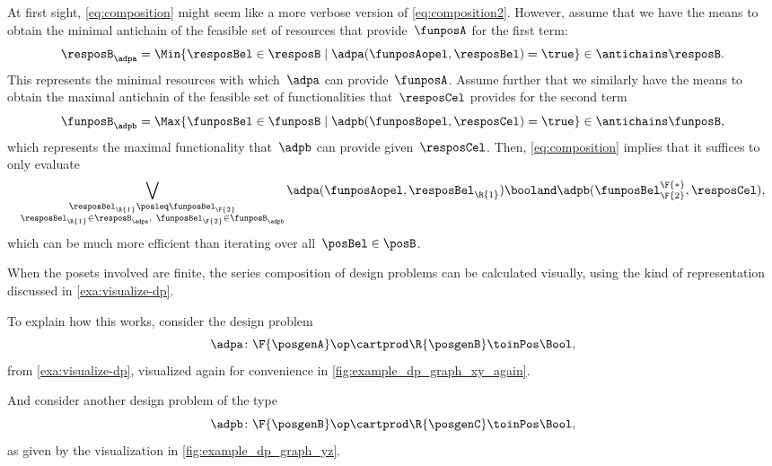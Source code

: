 \begin{remark}
    At first sight, \cref{eq:composition} might seem like a more verbose version of \cref{eq:composition2}.
    However, assume that we have the means to obtain the minimal antichain of the feasible set of resources that provide~$\funposA$ for the first term:
    \begin{equation*}
        \resposB_\adpa = \Min \{\resposBel\in \resposB \mid \adpa(\funposAopel,\resposBel)=\true\} \in \antichains \resposB.
    \end{equation*}
    This represents the minimal resources with which~$\adpa$ can provide~$\funposA$.
    Assume further that we similarly have the means to obtain the maximal antichain of the feasible set of functionalities that~$\resposCel$ provides for the second term
    \begin{equation*}
        \funposB_\adpb = \Max \{\funposBel\in \funposB \mid \adpb(\funposBopel,\resposCel)=\true\} \in \antichains \funposB,
    \end{equation*}
    which represents the maximal functionality that~$\adpb$ can provide given~$\resposCel$.
    Then, \cref{eq:composition} implies that it suffices to only evaluate
    \begin{equation*}
        \bigvee_{\substack{\resposBel_\R{1}\posleq\funposBel_\F{2} \\ \resposBel_\R{1}\in \resposB_\adpa,~ \funposBel_\F{2}\in\funposB_\adpb }} \adpa(\funposAopel,\resposBel_\R{1}) \booland \adpb(\funposBel_\F{2}^\F{*},\resposCel),
    \end{equation*}
    which can be much more efficient than iterating over all~$\posBel\in \posB$.
\end{remark}

When the posets involved are finite, the series composition of design problems can be calculated visually, using the kind of representation discussed in \cref{exa:visualize-dp}.
\begin{marginfigure}
    \centering
    \caption{ }
    \label{fig:example_dp_graph_xy_again}
\end{marginfigure}
To explain how this works, consider the design problem
\begin{equation*}
    \adpa \colon \F{\posgenA} \op \cartprod  \R{\posgenB} \toinPos \Bool,
\end{equation*}
from \cref{exa:visualize-dp}, visualized again for convenience in \cref{fig:example_dp_graph_xy_again}.
\begin{marginfigure}
    \centering
    \caption{ }
    \label{fig:example_dp_graph_yz}
\end{marginfigure}
And consider another design problem of the type
\begin{equation*}
    \adpb \colon \F{\posgenB} \op \cartprod  \R{\posgenC} \toinPos \Bool,
\end{equation*}
as given by the visualization in \cref{fig:example_dp_graph_yz}.

